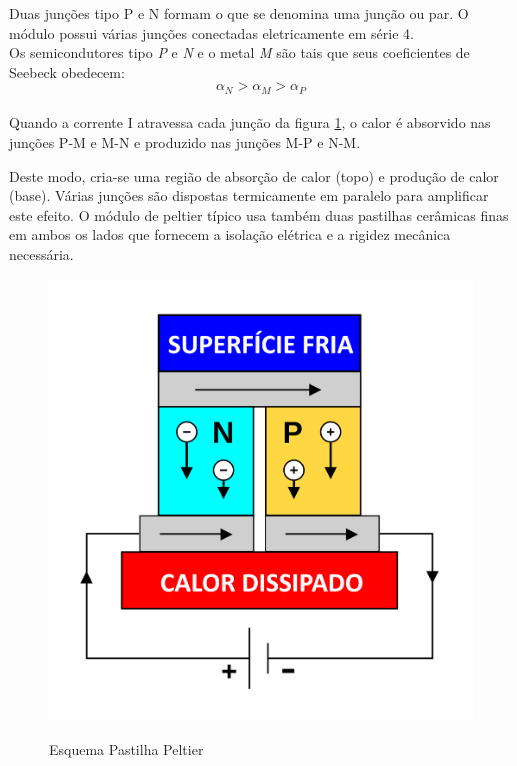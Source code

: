 \begin{enumerate}
Duas junções tipo P e N formam o que se denomina uma junção ou par. O módulo possui várias junções conectadas eletricamente em série 4.\\
Os semicondutores tipo \emph{P} e \emph{N} e o metal \emph{M} são tais que seus coeficientes de Seebeck obedecem:\\
\[\alpha _{N}> \alpha _{M}> \alpha _{P}\]\\
Quando a corrente I atravessa cada junção da figura \ref{fig:Ppeltier}, o calor é absorvido nas junções P-M e M-N e produzido nas junções M-P e N-M.\\
\begin{minipage}{0.5\linewidth}
Deste modo, cria-se uma região de absorção de calor (topo) e produção de calor (base). Várias junções são dispostas termicamente em paralelo para amplificar este efeito.
O módulo de peltier típico usa também duas pastilhas cerâmicas finas em ambos os lados que fornecem a isolação elétrica e a rigidez mecânica necessária.
\end{minipage}
\begin{minipage}{0.5\linewidth}
\begin{figure}[H]
		\centering
		\includegraphics[width=0.7\linewidth]{./ima/peltier02.jpg}
		\label{fig:Ppeltier}
		\caption{Esquema Pastilha Peltier}
	\end{figure}
\end{minipage}



\end{enumerate}
